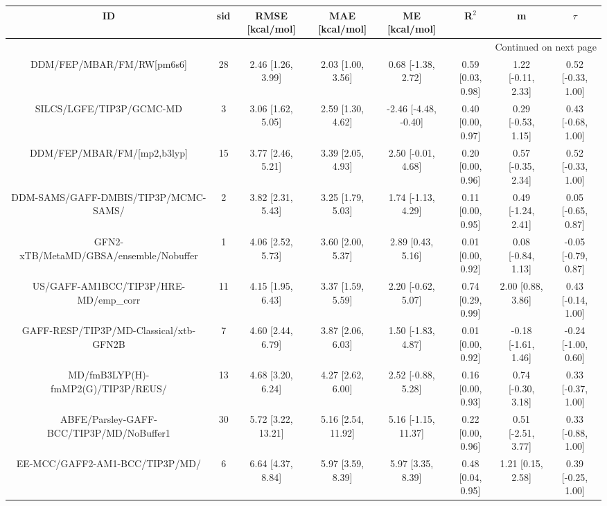 \documentclass[8pt]{article}
\begin{document}
\begin{center}
\begin{footnotesize}
\begin{longtable}{|cccccccc|}
\toprule
                                       ID & sid &     RMSE [kcal/mol] &      MAE [kcal/mol] &         ME [kcal/mol] &              R$^2$ &                    m &               $\tau$ \\
\midrule
\endhead
\midrule
\multicolumn{8}{r}{{Continued on next page}} \\
\midrule
\endfoot

\bottomrule
\endlastfoot
                DDM/FEP/MBAR/FM/RW[pm6s6] &  28 &   2.46 [1.26, 3.99] &   2.03 [1.00, 3.56] &    0.68 [-1.38, 2.72] &  0.59 [0.03, 0.98] &   1.22 [-0.11, 2.33] &   0.52 [-0.33, 1.00] \\
                 SILCS/LGFE/TIP3P/GCMC-MD &   3 &   3.06 [1.62, 5.05] &   2.59 [1.30, 4.62] &  -2.46 [-4.48, -0.40] &  0.40 [0.00, 0.97] &   0.29 [-0.53, 1.15] &   0.43 [-0.68, 1.00] \\
              DDM/FEP/MBAR/FM/[mp2,b3lyp] &  15 &   3.77 [2.46, 5.21] &   3.39 [2.05, 4.93] &    2.50 [-0.01, 4.68] &  0.20 [0.00, 0.96] &   0.57 [-0.35, 2.34] &   0.52 [-0.33, 1.00] \\
     DDM-SAMS/GAFF-DMBIS/TIP3P/MCMC-SAMS/ &   2 &   3.82 [2.31, 5.43] &   3.25 [1.79, 5.03] &    1.74 [-1.13, 4.29] &  0.11 [0.00, 0.95] &   0.49 [-1.24, 2.41] &   0.05 [-0.65, 0.87] \\
   GFN2-xTB/MetaMD/GBSA/ensemble/Nobuffer &   1 &   4.06 [2.52, 5.73] &   3.60 [2.00, 5.37] &     2.89 [0.43, 5.16] &  0.01 [0.00, 0.92] &   0.08 [-0.84, 1.13] &  -0.05 [-0.79, 0.87] \\
    US/GAFF-AM1BCC/TIP3P/HRE-MD/emp\_corr &  11 &   4.15 [1.95, 6.43] &   3.37 [1.59, 5.59] &    2.20 [-0.62, 5.07] &  0.74 [0.29, 0.99] &    2.00 [0.88, 3.86] &   0.43 [-0.14, 1.00] \\
   GAFF-RESP/TIP3P/MD-Classical/xtb-GFN2B &   7 &   4.60 [2.44, 6.79] &   3.87 [2.06, 6.03] &    1.50 [-1.83, 4.87] &  0.01 [0.00, 0.92] &  -0.18 [-1.61, 1.46] &  -0.24 [-1.00, 0.60] \\
       MD/fmB3LYP(H)-fmMP2(G)/TIP3P/REUS/ &  13 &   4.68 [3.20, 6.24] &   4.27 [2.62, 6.00] &    2.52 [-0.88, 5.28] &  0.16 [0.00, 0.93] &   0.74 [-0.30, 3.18] &   0.33 [-0.37, 1.00] \\
 ABFE/Parsley-GAFF-BCC/TIP3P/MD/NoBuffer1 &  30 &  5.72 [3.22, 13.21] &  5.16 [2.54, 11.92] &   5.16 [-1.15, 11.37] &  0.22 [0.00, 0.96] &   0.51 [-2.51, 3.77] &   0.33 [-0.88, 1.00] \\
           EE-MCC/GAFF2-AM1-BCC/TIP3P/MD/ &   6 &   6.64 [4.37, 8.84] &   5.97 [3.59, 8.39] &     5.97 [3.35, 8.39] &  0.48 [0.04, 0.95] &    1.21 [0.15, 2.58] &   0.39 [-0.25, 1.00] \\
\end{longtable}
\end{footnotesize}
\end{center}
\end{document}
